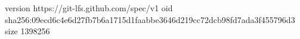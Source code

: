 version https://git-lfs.github.com/spec/v1
oid sha256:09ecd6c4e6d27fb7b6a1715d1faabbe3646d219cc72dcb98fd7ada3f455796d3
size 1398256
